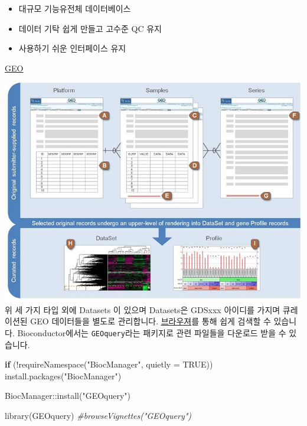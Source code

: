 \documentclass[
]{book}
\newenvironment{Shaded}{\begin{snugshade}}{\end{snugshade}}
\newcommand{\AttributeTok}[1]{\textcolor[rgb]{0.77,0.63,0.00}{#1}}
\newcommand{\CommentTok}[1]{\textcolor[rgb]{0.56,0.35,0.01}{\textit{#1}}}
\newcommand{\ConstantTok}[1]{\textcolor[rgb]{0.00,0.00,0.00}{#1}}
\newcommand{\ControlFlowTok}[1]{\textcolor[rgb]{0.13,0.29,0.53}{\textbf{#1}}}
\newcommand{\FunctionTok}[1]{\textcolor[rgb]{0.00,0.00,0.00}{#1}}
\newcommand{\NormalTok}[1]{#1}
\newcommand{\SpecialCharTok}[1]{\textcolor[rgb]{0.00,0.00,0.00}{#1}}
\newcommand{\StringTok}[1]{\textcolor[rgb]{0.31,0.60,0.02}{#1}}
\providecommand{\tightlist}{%
  \setlength{\itemsep}{0pt}\setlength{\parskip}{0pt}}
\begin{document}
\begin{itemize}
\tightlist
\item
  대규모 기능유전체 데이터베이스
\item
  데이터 기탁 쉽게 만들고 고수준 QC 유지
\item
  사용하기 쉬운 인터페이스 유지
\end{itemize}

\href{https://www.ncbi.nlm.nih.gov/geo/}{GEO}

\includegraphics[width=6.25in,height=\textheight]{images/04/geo_overview.jpg}
위 세 가지 타입 외에 Datasets 이 있으며 Datasets은 GDSxxx 아이디를 가지며 큐레이션된 GEO 데이터들을 별도로 관리합니다. \href{https://www.ncbi.nlm.nih.gov/geo/summary/}{브라우져}를 통해 쉽게 검색할 수 있습니다. Bioconductor에서는 \texttt{GEOquery}라는 패키지로 관련 파일들을 다운로드 받을 수 있습니다.

\begin{Shaded}
\begin{Highlighting}[]
\ControlFlowTok{if}\NormalTok{ (}\SpecialCharTok{!}\FunctionTok{requireNamespace}\NormalTok{(}\StringTok{"BiocManager"}\NormalTok{, }\AttributeTok{quietly =} \ConstantTok{TRUE}\NormalTok{))}
    \FunctionTok{install.packages}\NormalTok{(}\StringTok{"BiocManager"}\NormalTok{)}

\NormalTok{BiocManager}\SpecialCharTok{::}\FunctionTok{install}\NormalTok{(}\StringTok{"GEOquery"}\NormalTok{)}

\FunctionTok{library}\NormalTok{(GEOquery)}
\CommentTok{\#browseVignettes("GEOquery")}
\end{Highlighting}
\end{Shaded}
\end{document}
